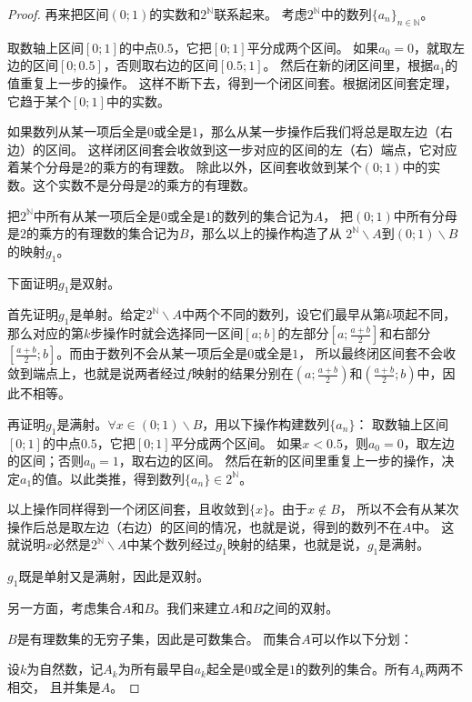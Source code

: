 \documentclass[12pt,UTF8]{ctexbook}
\begin{document}
\begin{appendix}
\begin{proof}
    再来把区间$(0;1)$的实数和$2^\mathbb{N}$联系起来。
    考虑$2^\mathbb{N}$中的数列$\{a_n\}_{n\in\mathbb{N}}$。

    取数轴上区间$[0;1]$的中点$0.5$，它把$[0;1]$平分成两个区间。
    如果$a_0 = 0$，就取左边的区间$[0;0.5]$，否则取右边的区间$[0.5;1]$。
    然后在新的闭区间里，根据$a_1$的值重复上一步的操作。
    这样不断下去，得到一个闭区间套。根据闭区间套定理，它趋于某个$[0;1]$中的实数。

    如果数列从某一项后全是$0$或全是$1$，那么从某一步操作后我们将总是取左边（右边）的区间。
    这样闭区间套会收敛到这一步对应的区间的左（右）端点，它对应着某个分母是$2$的乘方的有理数。
    除此以外，区间套收敛到某个$(0;1)$中的实数。这个实数不是分母是$2$的乘方的有理数。

    把$2^\mathbb{N}$中所有从某一项后全是$0$或全是$1$的数列的集合记为$A$，
    把$(0;1)$中所有分母是$2$的乘方的有理数的集合记为$B$，那么以上的操作构造了从
    $2^\mathbb{N}\backslash A$到$(0;1)\backslash B$的映射$g_1$。

    下面证明$g_1$是双射。

    首先证明$g_1$是单射。给定$2^\mathbb{N}\backslash A$中两个不同的数列，设它们最早从第$k$项起不同，
    那么对应的第$k$步操作时就会选择同一区间$[a; b]$的左部分$[a;\frac{a+b}{2}]$和右部分$[\frac{a+b}{2};b]$。而由于数列不会从某一项后全是$0$或全是$1$，
    所以最终闭区间套不会收敛到端点上，也就是说两者经过$f$映射的结果分别在$(a;\frac{a+b}{2})$和$(\frac{a+b}{2};b)$中，因此不相等。

    再证明$g_1$是满射。$\forall x \in (0;1)\backslash B$，用以下操作构建数列$\{a_n\}$：
    取数轴上区间$[0;1]$的中点$0.5$，它把$[0;1]$平分成两个区间。
    如果$x<0.5$，则$a_0=0$，取左边的区间；否则$a_0=1$，取右边的区间。
    然后在新的区间里重复上一步的操作，决定$a_1$的值。以此类推，得到数列$\{a_n\}\in 2^\mathbb{N}$。

    以上操作同样得到一个闭区间套，且收敛到$\{x\}$。由于$x\notin B$，
    所以不会有从某次操作后总是取左边（右边）的区间的情况，也就是说，得到的数列不在$A$中。
    这就说明$x$必然是$2^\mathbb{N}\backslash A$中某个数列经过$g_1$映射的结果，也就是说，$g_1$是满射。
    
    $g_1$既是单射又是满射，因此是双射。

    另一方面，考虑集合$A$和$B$。我们来建立$A$和$B$之间的双射。
    
    $B$是有理数集的无穷子集，因此是可数集合。
    而集合$A$可以作以下分划：

    设$k$为自然数，记$A_k$为所有最早自$a_k$起全是$0$或全是$1$的数列的集合。所有$A_k$两两不相交，
    且并集是$A$。


\end{proof}
\end{appendix}
\end{document}
